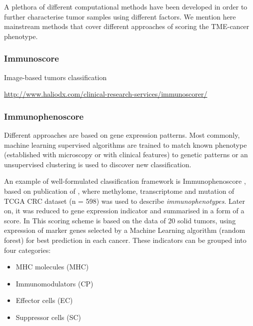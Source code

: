 \documentclass[12pt,]{book}
\providecommand{\tightlist}{%
  \setlength{\itemsep}{0pt}\setlength{\parskip}{0pt}}
\theoremstyle{definition}
\theoremstyle{definition}
\theoremstyle{definition}
\theoremstyle{remark}
\begin{document}
A plethora of different computational methods have been developed in
order to further characterise tumor samples using different factors. We
mention here mainstream methods that cover different approaches of
scoring the TME-cancer phenotype.

\hypertarget{immunoscore}{%
\subsubsection{Immunoscore}\label{immunoscore}}

Image-based tumors classification

\url{http://www.haliodx.com/clinical-research-services/immunoscorer/}

\citet{Galon2012}

\hypertarget{immunophenoscore}{%
\subsubsection{Immunophenoscore}\label{immunophenoscore}}

Different approaches are based on gene expression patterns. Most
commonly, machine learning supervised algorithms are trained to match
known phenotype (established with microscopy or with clinical features)
to genetic patterns or an unsupervised clustering is used to discover
new classification.

An example of well-formulated classification framework is
Immunophenoscore \citep{Charoentong}, based on publication of
\citet{Angelova2015}, where methylome, transcriptome and mutation of
TCGA CRC dataset (n = 598) was used to describe \emph{immunophenotypes}.
Later on, it was reduced to gene expression indicator and summarised in
a form of a score. In This scoring scheme is based on the data of 20
solid tumors, using expression of marker genes selected by a Machine
Learning algorithm (random forest) for best prediction in each cancer.
These indicators can be grouped into four categories:

\begin{itemize}
\tightlist
\item
  MHC molecules (MHC)
\item
  Immunomodulators (CP)
\item
  Effector cells (EC)
\item
  Suppressor cells (SC)
\end{itemize}
\end{document}
